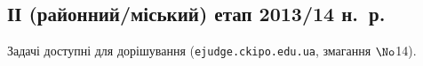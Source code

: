 \renewenvironment{problemAllDefault}[1]{\vspace{10mm}\par\begin{problem}{#1}{Клавіатура (stdin)}{Екран (stdout)}{1 сек}{64 мегабайти}}{\end{problem}}

\subsection{ІІ (районний/міський) етап 2013/14 н.~р.}

Задачі доступні для дорішування (\verb"ejudge.ckipo.edu.ua", змагання $\No$14).

\vspace{-0.5\baselineskip minus 1cm}
	

	

	

	


